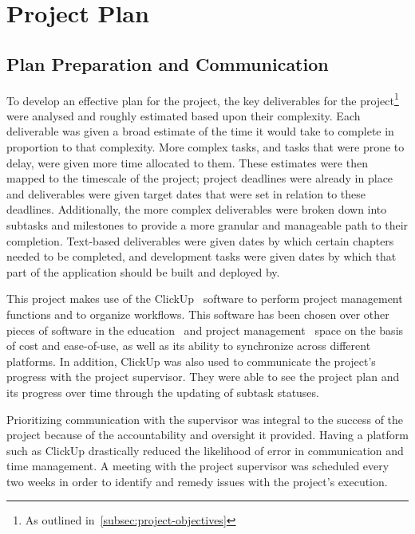 
\thispagestyle{plain}
\newpage
\section{Project Plan}\label{sec:project-plan}

\normalsize

\subsection{Plan Preparation and Communication}\label{subsec:plan-preparation-and-communication}

To develop an effective plan for the project, the key deliverables for the project\footnote{As outlined in~\ref{subsec:project-objectives}} were analysed and roughly estimated based upon their complexity.
Each deliverable was given a broad estimate of the time it would take to complete in proportion to that complexity.
More complex tasks, and tasks that were prone to delay, were given more time allocated to them.
These estimates were then mapped to the timescale of the project;
project deadlines were already in place and deliverables were given target dates that were set in relation to these deadlines.
Additionally, the more complex deliverables were broken down into subtasks and milestones to provide a more granular and manageable path to their completion.
Text-based deliverables were given dates by which certain chapters needed to be completed, and development tasks were given dates by which that part of the application should be built and deployed by.

This project makes use of the ClickUp~\citep{clickup} software to perform project management functions and to organize workflows.
This software has been chosen over other pieces of software in the education~\citep{education_software} and project management~\citep{pm_software} space on the basis of cost and ease-of-use, as well as its ability to synchronize across different platforms.
In addition, ClickUp was also used to communicate the project's progress with the project supervisor.
They were able to see the project plan and its progress over time through the updating of subtask statuses.

Prioritizing communication with the supervisor was integral to the success of the project because of the accountability and oversight it provided.
Having a platform such as ClickUp drastically reduced the likelihood of error in communication and time management.
A meeting with the project supervisor was scheduled every two weeks in order to identify and remedy issues with the project's execution.

